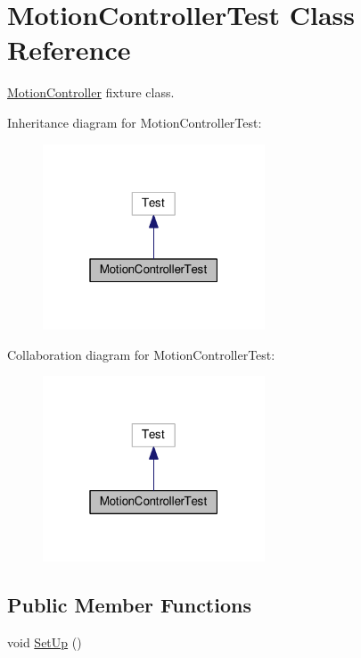 \hypertarget{classMotionControllerTest}{}\section{Motion\+Controller\+Test Class Reference}
\label{classMotionControllerTest}


\hyperlink{classMotionController}{Motion\+Controller} fixture class.  




Inheritance diagram for Motion\+Controller\+Test\+:
\nopagebreak
\begin{figure}[H]
\begin{center}
\leavevmode
\includegraphics[width=187pt]{classMotionControllerTest__inherit__graph}
\end{center}
\end{figure}


Collaboration diagram for Motion\+Controller\+Test\+:
\nopagebreak
\begin{figure}[H]
\begin{center}
\leavevmode
\includegraphics[width=187pt]{classMotionControllerTest__coll__graph}
\end{center}
\end{figure}
\subsection*{Public Member Functions}
\begin{DoxyCompactItemize}
\item 
void \hyperlink{classMotionControllerTest_a6b0cbf29096b0d74ec06488c1be82096}{Set\+Up} ()
\end{DoxyCompactItemize}
